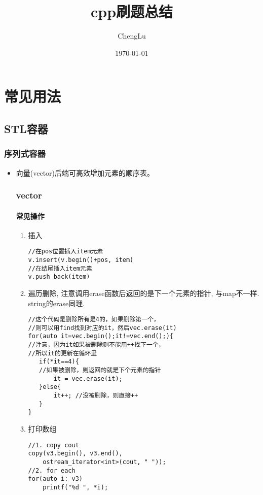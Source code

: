 \documentclass[UTF8]{ctexart}
\title{cpp刷题总结}
\author{ChengLu}
\date{\today}
\begin{document}
\maketitle
\tableofcontents

\section{常见用法}

\subsection{STL容器}

\subsubsection{序列式容器}
\begin{itemize}
\item 向量(vector)后端可高效增加元素的顺序表。

\subsubsection{vector}
\paragraph{常见操作}
\begin{enumerate}[(1)]
\item 插入
\begin{lstlisting}
//在pos位置插入item元素
v.insert(v.begin()+pos, item) 
//在结尾插入item元素
v.push_back(item)  
\end{lstlisting}

\item 遍历删除, 注意调用erase函数后返回的是下一个元素的指针, 与map不一样. string的erase同理.
\begin{lstlisting}
//这个代码是删除所有是4的，如果删除第一个，
//则可以用find找到对应的it，然后vec.erase(it)
for(auto it=vec.begin();it!=vec.end();){ 
//注意，因为it如果被删除则不能用++找下一个，
//所以it的更新在循环里
   if(*it==4){
   //如果被删除，则返回的就是下个元素的指针
       it = vec.erase(it); 
   }else{
       it++; //没被删除，则直接++
   }
}
\end{lstlisting}
\item 打印数组
\begin{lstlisting}
//1. copy cout
copy(v3.begin(), v3.end(), 
    ostream_iterator<int>(cout, " "));
//2. for each
for(auto i: v3)
    printf("%d ", *i);


\end{lstlisting}
\end{enumerate}
\end{itemize}
\end{document}
